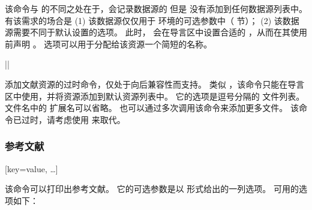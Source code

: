 \begin{ltxsyntax}
该命令与  的不同之处在于，会记录数据源的  但是  没有添加到任何数据源列表中。
有该需求的场合是 (1) 该数据源仅仅用于  环境的可选参数中（ 节）；
(2) 该数据源需要不同于默认设置的选项。
此时， 会在导言区中设置合适的 ，从而在其使用前声明 。
 选项可以用于分配给该资源一个简短的名称。

|\DeprecatedMark|


添加文献资源的过时命令，仅处于向后兼容性而支持。
类似 ，该命令只能在导言区中使用，并将资源添加到默认资源列表中。
它的选项是逗号分隔的  文件列表。
文件名中的  扩展名可以省略。
也可以通过多次调用该命令来添加更多文件。
该命令已过时，请考虑使用  来取代。

\end{ltxsyntax}

\subsubsection{参考文献}%
\label{use:bib:bib}

\begin{ltxsyntax}

[key=value, \dots]


该命令可以打印出参考文献。
它的可选参数是以 \keyval 形式给出的一列选项。
可用的选项如下：

\end{ltxsyntax}

